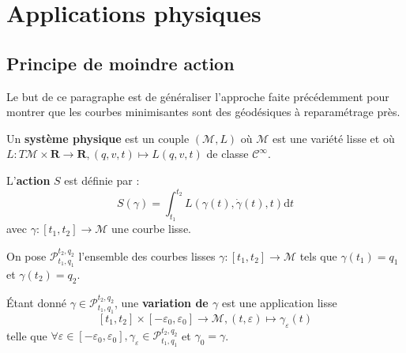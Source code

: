 \documentclass[12pt,a4paper]{article}
\theoremstyle{definition}
\begin{document}
\newpage
\section{Applications physiques}
\subsection{Principe de moindre action}
Le but de ce paragraphe est de généraliser l'approche faite précédemment pour montrer que les courbes minimisantes sont des géodésiques à reparamétrage près.

\medskip

Un \textbf{système physique} est un couple $(\mathcal{M},L)$ où $\mathcal{M}$ est une variété lisse et où\newline $L:T\mathcal{M}\times\mathbf{R}\to\mathbf{R},(q,v,t)\mapsto L(q,v,t)$ de classe $\mathcal{C}^\infty$.

L'\textbf{action} $S$ est définie par :
$$S(\gamma)=\int_{t_1}^{t_2}L(\gamma(t),\dot{\gamma}(t),t)\mathrm{d}t$$
avec $\gamma:[t_1,t_2]\to\mathcal{M}$ une courbe lisse.

On pose $\mathcal{P}_{t_1,q_1}^{t_2,q_2}$ l'ensemble des courbes lisses $\gamma:[t_1,t_2]\to\mathcal{M}$ tels que $\gamma(t_1)=q_1$ et $\gamma(t_2)=q_2$.

Étant donné $\gamma\in\mathcal{P}_{t_1,q_1}^{t_2,q_2}$, une \textbf{variation de $\gamma$} est une application lisse
$$
[t_1,t_2]\times[-\varepsilon_0,\varepsilon_0]\to\mathcal{M},(t,\varepsilon)\mapsto\gamma_\varepsilon(t)
$$
telle que $\forall \varepsilon\in [-\varepsilon_0,\varepsilon_0],\gamma_\varepsilon\in\mathcal{P}_{t_1,q_1}^{t_2,q_2}$ et $\gamma_0=\gamma$.
\end{document}
